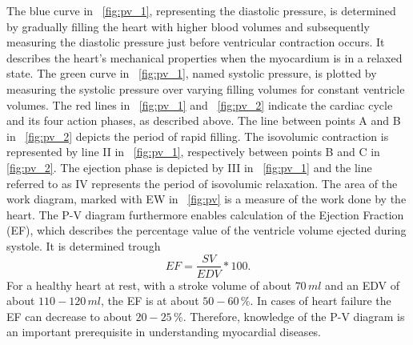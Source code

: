 The blue curve in \figurename~\ref{fig:pv_1}, representing the diastolic pressure, is determined by gradually filling the heart with higher blood volumes and subsequently measuring the diastolic pressure just before ventricular contraction occurs. It describes the heart's mechanical properties when the myocardium is in a relaxed state. The green curve in \figurename~\ref{fig:pv_1}, named systolic pressure, is plotted by measuring the systolic pressure over varying filling volumes for constant ventricle volumes. The red lines in \figurename~\ref{fig:pv_1} and \figurename~\ref{fig:pv_2} indicate the cardiac cycle and its four action phases, as described above. The line between points A and B in \figurename~\ref{fig:pv_2} depicts the period of rapid filling. The isovolumic contraction is represented by line II in \figurename~\ref{fig:pv_1}, respectively between points B and C in \figurename~ \ref{fig:pv_2}. The ejection phase is depicted by III in \figurename~\ref{fig:pv_1} and the line referred to as IV represents the period of isovolumic relaxation. The area of the work diagram, marked with EW in \figurename~\ref{fig:pv} is a measure of the work done by the heart. The P-V diagram furthermore enables calculation of the Ejection Fraction (EF), which describes the percentage value of the ventricle volume ejected during systole. It is determined trough
\begin{equation}
  EF = \frac{SV}{EDV}*100.
 \label{eq:EF}
\end{equation}
For a healthy heart at rest, with a stroke volume of about $70 \, ml$ and an EDV of about $110-120 \, ml$, the EF is at about $50-60\, \%$. In cases of heart failure the EF can decrease to about $20-25 \, \%$. Therefore, knowledge of the P-V diagram is an important prerequisite in understanding myocardial diseases. \cite{HKS4}

